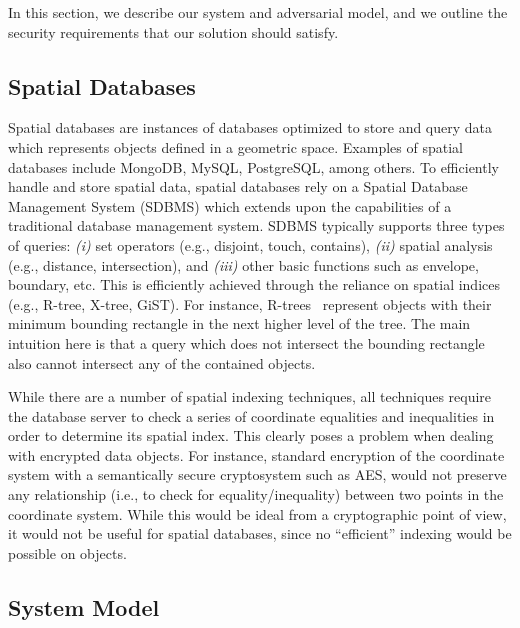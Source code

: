 \documentclass{llncs}
\begin{document}
In this section, we describe our system and adversarial model, and we outline the security requirements that our solution should satisfy.

\subsection{Spatial Databases}\label{subsec:geo}

Spatial databases are instances of databases optimized to store and query data which represents objects defined in a geometric space.
Examples of spatial databases include MongoDB, MySQL, PostgreSQL, among others.
To efficiently handle and store spatial data, spatial databases rely on a Spatial Database Management System (SDBMS) which extends upon the capabilities of a traditional database management system.
SDBMS typically supports three types of queries: \emph{(i)} set operators (e.g., disjoint, touch, contains), \emph{(ii)} spatial analysis (e.g., distance, intersection), and \emph{(iii)} other basic functions such as envelope, boundary, etc.
This is efficiently achieved through the reliance on spatial indices (e.g., R-tree, X-tree, GiST). For instance, R-trees~\cite{Rtree} represent objects with their minimum bounding rectangle in the next higher level of the tree.
The main intuition here is that a query which does not intersect the bounding rectangle also cannot intersect any of the contained objects.

While there are a number of spatial indexing techniques, all techniques require the database server to check a series of coordinate equalities and inequalities in order to determine
its spatial index. This clearly poses a problem when dealing with encrypted data objects. For instance, standard encryption
of the coordinate system with a semantically secure cryptosystem such as AES, would not preserve any relationship (i.e., to check for equality/inequality) between two points in the coordinate system. While this
would be ideal from a cryptographic point of view, it would not be useful for spatial databases, since no ``efficient'' indexing would be possible on objects.


\subsection{System Model}
\end{document}

